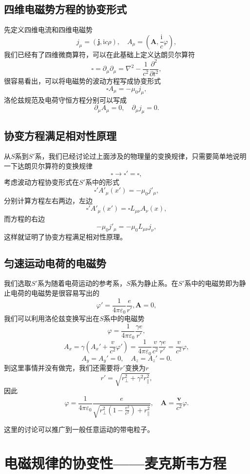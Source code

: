 \documentclass[UTF8]{ctexbook}
\renewcommand{\b}{\boldsymbol}
\renewcommand{\i}{\mathrm{i}}
\renewcommand{\k}{\frac{1}{4\pi\varepsilon_0}}
\numberwithin{equation}{chapter}
\begin{document}
	\subsection{四维电磁势方程的协变形式}
	先定义四维电流和四维电磁势
	\[j_\mu=(\b{j},\i c\rho),\quad A_\mu=(\b{A},\frac{\i}{c}\varphi),\]
	我们已经有了四维微商算符，可以在此基础上定义达朗贝尔算符
	\[\square=\partial_\mu\partial_\mu=\nabla^2-\frac{1}{c^2}\frac{\partial^2}{\partial t^2},\]
	很容易看出，可以将电磁势的波动方程写成协变形式
	\[\square A_\mu=-\mu_0j_\mu,\]
	洛伦兹规范及电荷守恒方程分别可以写成
	\[\partial_\mu A_\mu=0,\quad \partial_\mu j_\mu=0.\]
	
	\subsection{协变方程满足相对性原理}
	
	从$S$系到$S'$系，我们已经讨论过上面涉及的物理量的变换规律，只需要简单地说明一下达朗贝尔算符的变换规律
	\[\square\rightarrow \square'=\square,\]
	考虑波动方程协变形式在$S'$系中的形式
	\[\square'A'_\mu(x')=-\mu_0j'_\mu,\]
	分别计算方程左右两边，左边
	\[\square'A'_\mu(x')=\square L_{\mu\nu}A_\nu(x),\]
	而方程的右边
	\[-\mu_0j'_\mu=-\mu_0L_{\mu\nu}j_\nu,\]
	这样就证明了协变方程满足相对性原理。
	
	\subsection{匀速运动电荷的电磁势}
	我们选取$S'$系为随着电荷运动的参考系，$S$系为静止系。在$S'$系中的电磁势即为静止电荷的电磁势是很容易写出的
	\[\varphi'=\k \frac{e}{r'},\b{A}=0,\]
	我们可以利用洛伦兹变换写出在$S$系中的电磁势
	\[\varphi=\frac{1}{4\pi\varepsilon_0}\frac{\gamma e}{r'},\]
	\[A_x=\gamma\left(A_x'+\frac{v}{c^2}\varphi'\right)=\k\frac{v}{c^2}\frac{\gamma e}{r'}=\frac{v}{c^2}\varphi,\]
	\[A_y=A_y'=0,\quad A_z=A_z'=0.\]
	到这里事情并没有做完，我们还需要将$r'$变换为$r$
	\[r'=\sqrt{r_{\perp}^2+\gamma^2r_{\parallel}^2},\]
	因此
	\[\varphi=\k\frac{e}{\sqrt{r_{\perp}^2\left(1-\frac{v^2}{c^2}\right)+r_{\parallel}^2}},\quad \b{A}=\frac{\b{v}}{c^2}\varphi.\]
	
	这里的讨论可以推广到一般任意运动的带电粒子。
	
	\section{电磁规律的协变性——麦克斯韦方程}
\end{document}
